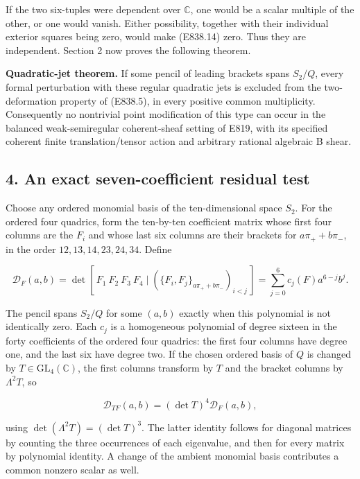 If the two six-tuples were dependent over \(\mathbb C\), one would be a
scalar multiple of the other, or one would vanish. Either possibility,
together with their individual exterior squares being zero, would make
(E838.14) zero. Thus they are independent. Section 2 now proves the
following theorem.

\textbf{Quadratic-jet theorem.} If some pencil of leading brackets spans
\(S_2/Q\), every formal perturbation with these regular quadratic jets
is excluded from the two-deformation property of (E838.5), in every
positive common multiplicity. Consequently no nontrivial point
modification of this type can occur in the balanced weak-semiregular
coherent-sheaf setting of E819, with its specified coherent finite
translation/tensor action and arbitrary rational algebraic B shear.

\subsection{4. An exact seven-coefficient residual
test}\label{an-exact-seven-coefficient-residual-test}

Choose any ordered monomial basis of the ten-dimensional space \(S_2\).
For the ordered four quadrics, form the ten-by-ten coefficient matrix
whose first four columns are the \(F_i\) and whose last six columns are
their brackets for \(a\pi_++b\pi_-\), in the order
\(12,13,14,23,24,34\). Define

\[
 \mathcal D_F(a,b)
   =\det[\,F_1\ F_2\ F_3\ F_4\mid
       (\{F_i,F_j\}_{a\pi_++b\pi_-})_{i<j}\,]
   =\sum_{j=0}^{6}c_j(F)a^{6-j}b^j.
 \tag{E838.15}
\]

The pencil spans \(S_2/Q\) for some \((a,b)\) exactly when this
polynomial is not identically zero. Each \(c_j\) is a homogeneous
polynomial of degree sixteen in the forty coefficients of the ordered
four quadrics: the first four columns have degree one, and the last six
have degree two. If the chosen ordered basis of \(Q\) is changed by
\(T\in\mathrm{GL}_4(\mathbb C)\), the first columns transform by \(T\)
and the bracket columns by \(\Lambda^2T\), so

\[
 \mathcal D_{TF}(a,b)=(\det T)^4\mathcal D_F(a,b),
 \tag{E838.16}
\]

using \(\det(\Lambda^2T)=(\det T)^3\). The latter identity follows for
diagonal matrices by counting the three occurrences of each eigenvalue,
and then for every matrix by polynomial identity. A change of the
ambient monomial basis contributes a common nonzero scalar as well.

